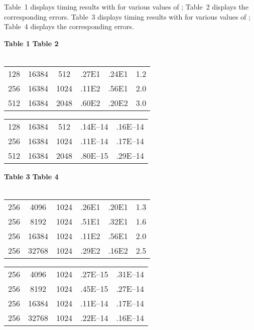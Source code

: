 \documentclass[letterpaper,12pt]{article}
\begin{document}
Table~1 displays timing results with  for various values of ;
Table~2 displays the corresponding errors.
Table~3 displays timing results with  for various values of ;
Table~4 displays the corresponding errors.


\begin{table}
\hfil {\bf Table 1} \hfil\hfil {\bf Table 2} \hfil \\\vspace{-.75em}\\
\begin{tabular}{c|c|c|c|c|c}
 &    &   &  &  &  \\\hline
128 & 16384 &  512 & .27E1 &       .24E1 &             1.2 \\
256 & 16384 & 1024 & .11E2 &       .56E1 &             2.0 \\
512 & 16384 & 2048 & .60E2 &       .20E2 &             3.0 \\
\end{tabular}
\hfil
\begin{tabular}{c|c|c|c|c}
 &    &   &  &  \\\hline
128 & 16384 &  512 &     .14E--14 &           .16E--14 \\
256 & 16384 & 1024 &     .11E--14 &           .17E--14 \\
512 & 16384 & 2048 &     .80E--15 &           .29E--14 \\
\end{tabular}

\bigskip
\bigskip

\hfil {\bf Table 3} \hfil\hfil {\bf Table 4} \hfil \\\vspace{-.75em}\\
\begin{tabular}{c|c|c|c|c|c}
 &    &   &  &  &  \\\hline
256 &  4096 & 1024 & .26E1 &       .20E1 &             1.3 \\
256 &  8192 & 1024 & .51E1 &       .32E1 &             1.6 \\
256 & 16384 & 1024 & .11E2 &       .56E1 &             2.0 \\
256 & 32768 & 1024 & .29E2 &       .16E2 &             2.5 \\
\end{tabular}
\hfil
\begin{tabular}{c|c|c|c|c}
 &    &   &  &  \\\hline
256 &  4096 & 1024 &     .27E--15 &           .31E--14 \\
256 &  8192 & 1024 &     .45E--15 &           .27E--14 \\
256 & 16384 & 1024 &     .11E--14 &           .17E--14 \\
256 & 32768 & 1024 &     .22E--14 &           .16E--14 \\
\end{tabular}

\bigskip
\end{table}
\end{document}
